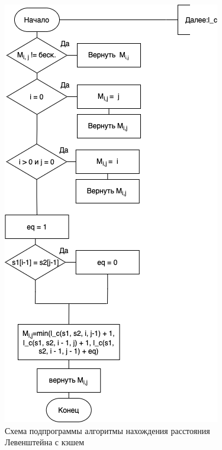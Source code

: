 \documentclass[12pt]{report}
\begin{document}
\begin{figure}[h]
	\centering
	\includegraphics[scale=0.85]{lev_cache_aux.png}
	\caption{Схема подпрограммы алгоритмы нахождения расстояния Левенштейна с кэшем}
	\label{fig:rec_lev_cache_aux}
\end{figure}
\end{document}
